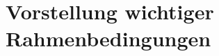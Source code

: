 \documentclass[a4paper,
DIV=13,
12pt,
BCOR=10mm,
department=FakIM,
oneside,
parskip=half,
automark,
listof=totocnumbered,
bibliography=totocnumbered,
acronym=totocnumbered
] {OTHRartcl}
\begin{document}
\section{Vorstellung wichtiger Rahmenbedingungen}
\label{sec:VorstellungwichtigerRahmenbedinungen}
\end{document}
